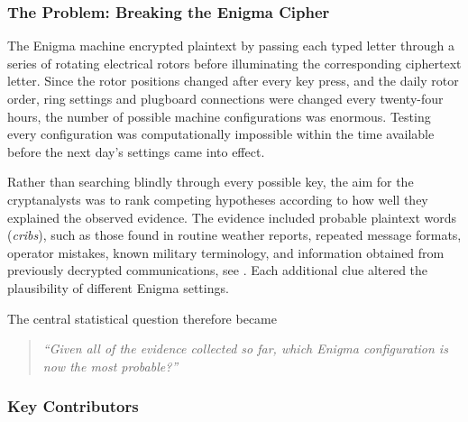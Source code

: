 \subsubsection*{The Problem: Breaking the Enigma Cipher}

The Enigma machine encrypted plaintext by passing each typed letter through a series of rotating electrical rotors before illuminating the corresponding ciphertext letter. Since the rotor positions changed after every key press, and the daily rotor order, ring settings and plugboard connections were changed every twenty-four hours, the number of possible machine configurations was enormous. Testing every configuration was computationally impossible within the time available before the next day's settings came into effect.


Rather than searching blindly through every possible key, the aim for the cryptanalysts was to rank competing hypotheses according to how well they explained the observed evidence. The evidence included probable plaintext words (\emph{cribs}), \cite{hodges2014} such as those found in routine weather reports, repeated message formats, operator mistakes, known military terminology, and information obtained from previously decrypted communications, see \cite{kahn1996,hinsley1993}. Each additional clue altered the plausibility of different Enigma settings.

The central statistical question therefore became

\begin{quote}
\itshape
``Given all of the evidence collected so far, which Enigma configuration is now the most probable?''
\end{quote}

\subsubsection*{Key Contributors}


